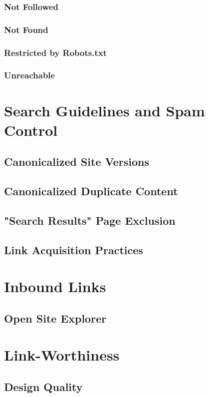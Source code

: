 \documentclass[fleqn,10pt]{SelfArx} %
\begin{document}
\subsubsection{Not Followed}
\subsubsection{Not Found}
\subsubsection{Restricted by Robots.txt}
\subsubsection{Unreachable}


\section{Search Guidelines and Spam Control}

\subsection{Canonicalized Site Versions}
\subsection{Canonicalized Duplicate Content}
\subsection{"Search Results" Page Exclusion}
\subsection{Link Acquisition Practices}


\section{Inbound Links}

\subsection{Open Site Explorer}
\section{Link-Worthiness}
\subsection{Design Quality}
\end{document}
